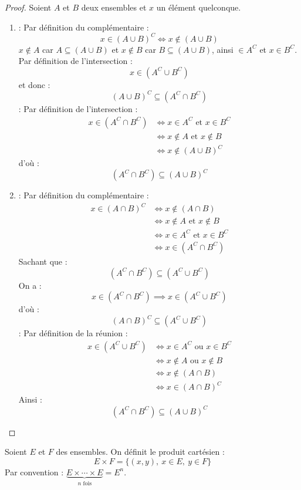 \begin{proof}
	Soient $A$ et $B$ deux ensembles et $x$ un élément quelconque. 
	\begin{enumerate}
		\item \boxed{\subseteq} : Par définition du complémentaire :
		\[ x \in (A \cup B)^C \iff x \notin (A \cup B) \]
		$x \notin A$ car $A \subseteq (A \cup B)$ et $x \notin B$ car $B \subseteq (A \cup B)$, ainsi $ \in A^C$ et $x \in B^C$. 
		\\
		Par définition de l'intersection :
		\[ x \in (A^C \cup B^C) \]
		et donc :
		\[ (A \cup B)^C \subseteq (A^C \cap B^C) \]
		\boxed{\supseteq} : Par définition de l'intersection :
		\begin{align*}
			x \in (A^C \cap B^C) &\iff x \in A^C \text{ et } x \in B^C \\
			&\iff x \notin A \text{ et } x \notin B \\
			&\iff x \notin (A \cup B)^C
		\end{align*}
		d'où :
		\[ (A^C \cap B^C) \subseteq (A \cup B)^C \]
		\item \boxed{\subseteq} : Par définition du complémentaire :
		\begin{align*}
			x \in (A \cap B)^C &\iff x \notin (A \cap B) \\
			&\iff x \notin A \text{ et } x \notin B \\
			&\iff x \in A^C \text{ et } x \in B^C \\
			&\iff x \in (A^C \cap B^C)
		\end{align*}
		Sachant que :
		\[ (A^C \cap B^C) \subseteq (A^C \cup B^C) \]
		On a :
		\[ x \in (A^C \cap B^C) \implies x \in (A^C \cup B^C) \]
		d'où :
		\[ (A \cap B)^C \subseteq (A^C \cup B^C) \]
		\boxed{\supseteq} : Par définition de la réunion :
		\begin{align*}
			x \in (A^C \cup B^C) &\iff x \in A^C \text{ ou } x \in B^C \\
			&\iff x \notin A \text{ ou } x \notin B \\
			&\iff x \notin (A \cap B) \\
			&\iff x \in (A \cap B)^C
		\end{align*}
		Ainsi : 
		\[ (A^C \cap B^C) \subseteq (A \cup B)^C \]
	\end{enumerate}
\end{proof}

\begin{definition}
    Soient $E$ et $F$ des ensembles. On définit le produit cartésien :
    \[ E \times F = \{ (x, y),\ x \in E,\ y \in F \} \]
    Par convention : $\underbrace{E \times \cdots \times E}_{n \text{ fois}} = E^n$.
\end{definition}
